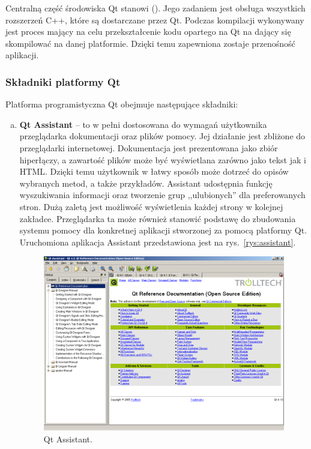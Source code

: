 Centralną część środowiska Qt stanowi  (). Jego zadaniem jest obsługa wszystkich rozszerzeń C++, które są 
dostarczane przez Qt. Podczas kompilacji wykonywany jest proces mający na celu przekształcenie kodu opartego na Qt na dający się skompilować 
na danej platformie. Dzięki temu zapewniona zostaje przenośność aplikacji.

\subsubsection*{Składniki platformy Qt}

Platforma programistyczna Qt obejmuje następujące składniki:
\begin{enumerate}[a)]
	\item \textbf{Qt Assistant} -- to w pełni dostosowana do wymagań użytkownika przeglądarka dokumentacji oraz plików pomocy. Jej działanie jest 
	zbliżone do przeglądarki internetowej. Dokumentacja jest prezentowana jako zbiór hiperłączy, a zawartość plików może być wyświetlana 
	zarówno jako tekst jak i HTML. Dzięki temu użytkownik w łatwy sposób może dotrzeć do opisów wybranych metod, a także przykładów. Assistant 
	udostępnia funkcję wyszukiwania informacji oraz tworzenie grup ,,ulubionych'' dla preferowanych stron. Dużą zaletą jest możliwość wyświetlenia 
	każdej strony w kolejnej zakładce. Przeglądarka ta może również stanowić podstawę do zbudowania systemu pomocy dla konkretnej aplikacji 
	stworzonej za pomocą platformy Qt. Uruchomiona aplikacja Assistant przedstawiona jest na rys.~\vref{rys:assistant}.
	\begin{figure}[ht]
	\centering\includegraphics[scale=0.4]{figures/assistant.png}
	\caption{Qt Assistant.}\label{rys:assistant}
	\end{figure}


\end{enumerate}
